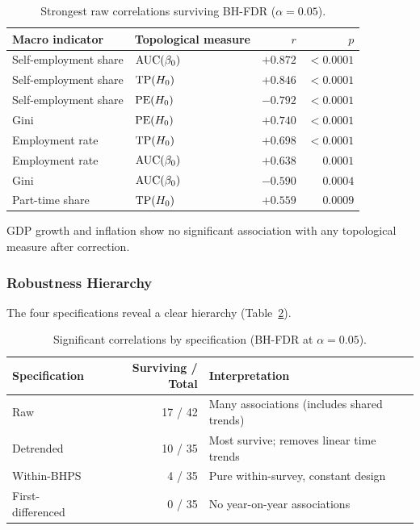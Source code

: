 \begin{table}[htbp]
  \centering
  \caption{Strongest raw correlations surviving BH-FDR ($\alpha = 0.05$).}
  \label{tab:macro_full}
  \begin{tabular}{llrr}
    \toprule
    Macro indicator & Topological measure & $r$ & $p$ \\
    \midrule
    Self-employment share & $\mathrm{AUC}(\beta_0)$ & $+0.872$ & $< 0.0001$ \\
    Self-employment share & $\mathrm{TP}(H_{0})$   & $+0.846$ & $< 0.0001$ \\
    Self-employment share & $\mathrm{PE}(H_{0})$   & $-0.792$ & $< 0.0001$ \\
    Gini                  & $\mathrm{PE}(H_{0})$   & $+0.740$ & $< 0.0001$ \\
    Employment rate       & $\mathrm{TP}(H_{0})$   & $+0.698$ & $< 0.0001$ \\
    Employment rate       & $\mathrm{AUC}(\beta_0)$ & $+0.638$ & $0.0001$ \\
    Gini                  & $\mathrm{AUC}(\beta_0)$ & $-0.590$ & $0.0004$ \\
    Part-time share       & $\mathrm{TP}(H_{0})$   & $+0.559$ & $0.0009$ \\
    \bottomrule
  \end{tabular}
\end{table}

GDP growth and inflation show no significant association with any topological
measure after correction.

\subsubsection{Robustness Hierarchy}

The four specifications reveal a clear hierarchy (Table~\ref{tab:robustness}).

\begin{table}[htbp]
  \centering
  \caption{Significant correlations by specification (BH-FDR at $\alpha = 0.05$).}
  \label{tab:robustness}
  \begin{tabular}{lrl}
    \toprule
    Specification & Surviving / Total & Interpretation \\
    \midrule
    Raw             & 17 / 42 & Many associations (includes shared trends) \\
    Detrended       & 10 / 35 & Most survive; removes linear time trends \\
    Within-BHPS     &  4 / 35 & Pure within-survey, constant design \\
    First-differenced &  0 / 35 & No year-on-year associations \\
    \bottomrule
  \end{tabular}
\end{table}

